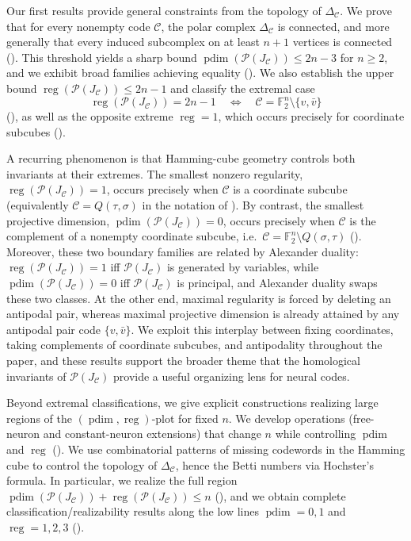 \documentclass[12pt]{amsart}
\theoremstyle{remark}
\theoremstyle{definition}
\DeclareMathOperator{\reg}{reg}
\DeclareMathOperator{\pd}{pdim}
\newcommand{\F}{\mathbb{F}}
\newcommand{\C}{\mathcal{C}}
\def\P{{\mathcal P}}
\begin{document}
Our first results provide general constraints from the topology of $\Delta_\C$.
We prove that for every nonempty code $\C$, the polar complex $\Delta_\C$ is connected, and more
generally that every induced subcomplex on at least $n+1$ vertices is connected
().  This threshold yields a sharp bound
$\pd(\P(J_\C))\le 2n-3$ for $n\geq 2$, and we exhibit broad families achieving equality
().  We also establish the
upper bound $\reg(\P(J_\C))\le 2n-1$ and classify the extremal case
\[
\reg(\P(J_\C))=2n-1 \quad\Longleftrightarrow\quad \C=\F_2^n\setminus\{v,\bar v\}
\]
(), as well as the opposite extreme $\reg=1$, which
occurs precisely for coordinate subcubes ().

A recurring phenomenon is that Hamming-cube geometry controls both invariants at their extremes.
The smallest nonzero regularity, $\reg(\P(J_\C))=1$, occurs precisely when $\C$ is a coordinate subcube
(equivalently $\C=Q(\tau,\sigma)$ in the notation of ).
By contrast, the smallest projective dimension, $\pd(\P(J_\C))=0$, occurs precisely when $\C$ is the complement
of a nonempty coordinate subcube, i.e.\ $\C=\F_2^n\setminus Q(\sigma,\tau)$
(). Moreover, these two boundary families are related by Alexander duality:  $\reg(\P(J_\C))=1$ iff $\P(J_\C)$ is generated by variables, while $\pd(\P(J_\C))=0$ iff $\P(J_\C)$ is principal, and Alexander duality swaps these two classes.
At the
other end, maximal regularity is forced by deleting an antipodal pair, whereas maximal projective
dimension is already attained by any antipodal pair code $\{v,\bar v\}$. We exploit this interplay
between fixing coordinates, taking complements of coordinate subcubes, and antipodality throughout the
paper, and these results support the broader theme that the homological invariants of $\P(J_\C)$
provide a useful organizing lens for neural codes.


Beyond extremal classifications, we give explicit constructions realizing large regions of the
$(\pd,\reg)$-plot for fixed $n$.  We develop operations (free-neuron and constant-neuron extensions)
that change $n$ while controlling $\pd$ and $\reg$ ().  We use
combinatorial patterns of missing codewords in the Hamming cube to control the topology
of $\Delta_\C$, hence the Betti numbers via Hochster’s formula.  In particular, we realize the full
region $\pd(\P(J_\C))+\reg(\P(J_\C))\le n$ (), and we obtain complete
classification/realizability results along the low lines $\pd=0,1$ and $\reg=1,2,3$
().
\end{document}

